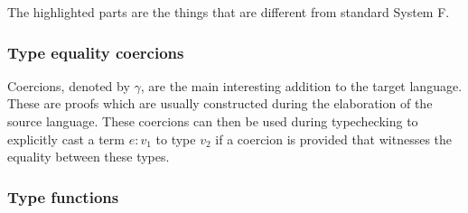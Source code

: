 The highlighted parts are the things that are different from standard System F.

\subsubsection{Type equality coercions}

Coercions, denoted by $\gamma$, are the main interesting addition to the target
language. These are proofs which are usually constructed during the elaboration
of the source language. These coercions can then be used during typechecking to
explicitly cast a term $e : v_1$ to type $v_2$ if a coercion is provided that
witnesses the equality between these types.

\subsubsection{Type functions}

